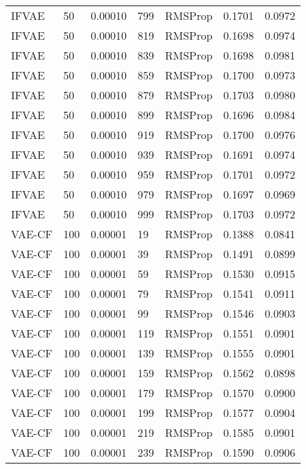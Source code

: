 \begin{tabular}{llrllrr}
   IFVAE &   50 &  0.00010 &   799 &   RMSProp &  0.1701 &       0.0972 \\
   IFVAE &   50 &  0.00010 &   819 &   RMSProp &  0.1698 &       0.0974 \\
   IFVAE &   50 &  0.00010 &   839 &   RMSProp &  0.1698 &       0.0981 \\
   IFVAE &   50 &  0.00010 &   859 &   RMSProp &  0.1700 &       0.0973 \\
   IFVAE &   50 &  0.00010 &   879 &   RMSProp &  0.1703 &       0.0980 \\
   IFVAE &   50 &  0.00010 &   899 &   RMSProp &  0.1696 &       0.0984 \\
   IFVAE &   50 &  0.00010 &   919 &   RMSProp &  0.1700 &       0.0976 \\
   IFVAE &   50 &  0.00010 &   939 &   RMSProp &  0.1691 &       0.0974 \\
   IFVAE &   50 &  0.00010 &   959 &   RMSProp &  0.1701 &       0.0972 \\
   IFVAE &   50 &  0.00010 &   979 &   RMSProp &  0.1697 &       0.0969 \\
   IFVAE &   50 &  0.00010 &   999 &   RMSProp &  0.1703 &       0.0972 \\
  VAE-CF &  100 &  0.00001 &    19 &   RMSProp &  0.1388 &       0.0841 \\
  VAE-CF &  100 &  0.00001 &    39 &   RMSProp &  0.1491 &       0.0899 \\
  VAE-CF &  100 &  0.00001 &    59 &   RMSProp &  0.1530 &       0.0915 \\
  VAE-CF &  100 &  0.00001 &    79 &   RMSProp &  0.1541 &       0.0911 \\
  VAE-CF &  100 &  0.00001 &    99 &   RMSProp &  0.1546 &       0.0903 \\
  VAE-CF &  100 &  0.00001 &   119 &   RMSProp &  0.1551 &       0.0901 \\
  VAE-CF &  100 &  0.00001 &   139 &   RMSProp &  0.1555 &       0.0901 \\
  VAE-CF &  100 &  0.00001 &   159 &   RMSProp &  0.1562 &       0.0898 \\
  VAE-CF &  100 &  0.00001 &   179 &   RMSProp &  0.1570 &       0.0900 \\
  VAE-CF &  100 &  0.00001 &   199 &   RMSProp &  0.1577 &       0.0904 \\
  VAE-CF &  100 &  0.00001 &   219 &   RMSProp &  0.1585 &       0.0901 \\
  VAE-CF &  100 &  0.00001 &   239 &   RMSProp &  0.1590 &       0.0906 \\

\end{tabular}
